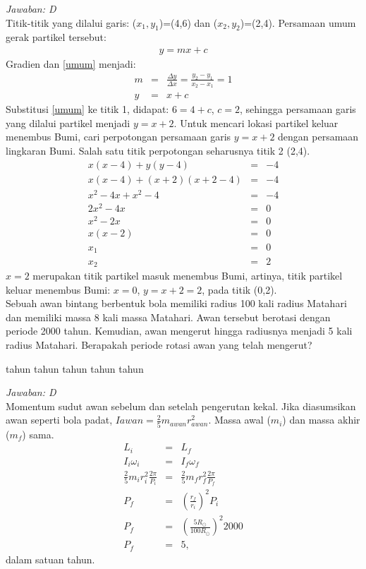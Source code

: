 \documentclass[11pt,fleqn]{exam}
\begin{document}
\begin{questions}
\textit{Jawaban: D}\\
Titik-titik yang dilalui garis: ($x_1,y_1$)=(4,6) dan ($x_2,y_2$)=(2,4). Persamaan umum gerak partikel tersebut:
\begin{eqnarray}
y=mx+c
\label{umum}
\end{eqnarray}
\noindent Gradien dan \autoref{umum} menjadi:
\begin{eqnarray}
m&=&\frac{\Delta y}{\Delta x}=\frac{y_2-y_1}{x_2-x_1}=1\\
y&=&x+c
\end{eqnarray}
\noindent Substitusi \autoref{umum} ke titik 1, didapat: $6=4+c$, $c=2$, sehingga persamaan garis yang dilalui partikel menjadi $y=x+2$. Untuk mencari lokasi partikel keluar menembus Bumi, cari perpotongan persamaan garis $y=x+2$ dengan persamaan lingkaran Bumi. Salah satu titik perpotongan seharusnya titik 2 (2,4).
\begin{eqnarray*}
x(x-4)+y(y-4)&=&-4 \\
x(x-4)+(x+2)(x+2-4)&=&-4 \\
x^2-4x+x^2-4&=&-4 \\
2x^2-4x&=&0 \\
x^2-2x&=&0 \\
x(x-2)&=&0 \\
x_1&=&0 \\
x_2&=&2
\end{eqnarray*}
\noindent $x=2$ merupakan titik partikel masuk menembus Bumi, artinya, titik partikel keluar menembus Bumi: $x=0$, $y=x+2=2$, pada titik (0,2).\\


\question Sebuah awan bintang berbentuk bola memiliki radius 100 kali radius Matahari dan memiliki massa 8 kali massa Matahari. Awan tersebut berotasi dengan periode 2000 tahun. Kemudian, awan mengerut hingga radiusnya menjadi 5 kali radius Matahari. Berapakah periode rotasi awan yang telah mengerut?
\begin{choices}
 tahun
 tahun
 tahun
 tahun
 tahun
\end{choices}

\textit{Jawaban: D}\\
Momentum sudut awan sebelum dan setelah pengerutan kekal. Jika diasumsikan awan seperti bola padat, $I{awan}=\frac{2}{5}m_{awan}r_{awan}^2$. Massa awal ($m_i$) dan massa akhir ($m_f$) sama.
\begin{eqnarray*}
L_i &=& L_f \\
I_i\omega_i &=& I_f\omega_f \\
\frac{2}{5}m_i r_i^2 \frac{2\pi}{P_i}&=&\frac{2}{5}m_f r_f^2 \frac{2\pi}{P_f}\\
P_f&=&\left(\frac{r_f}{r_i}\right)^2 P_i\\
P_f&=&\left(\frac{5R_{\odot}}{100R_{\odot}}\right)^2 2000 \\
P_f&=&5,
\end{eqnarray*}
\noindent dalam satuan tahun.\\



\end{questions}
\end{document}
